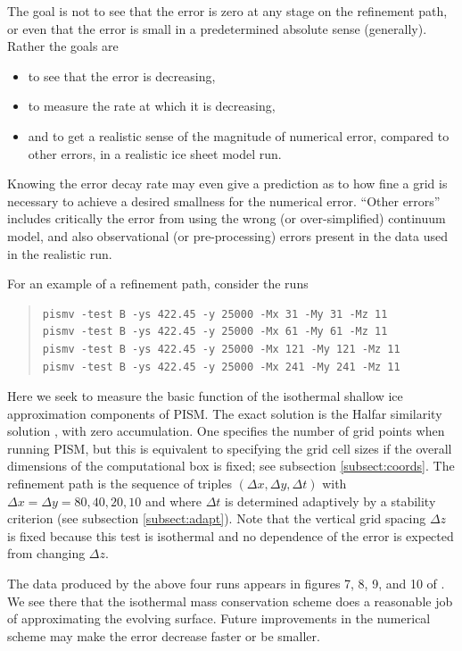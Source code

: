 \documentclass[11pt,final]{amsart}
\begin{document}
The goal is not to see that the error is zero at any stage on the refinement path, or even that the error is small in a predetermined absolute sense (generally).  Rather the goals are \begin{itemize}
\item to see that the error is decreasing,
\item to measure the rate at which it is decreasing,
\item and to get a realistic sense of the magnitude of numerical error, compared to other errors, in a realistic ice sheet model run.
\end{itemize}
Knowing the error decay rate may even give a prediction as to how fine a grid is necessary to achieve a desired smallness for the numerical error.  ``Other errors'' includes critically the error from using the wrong (or over-simplified) continuum model, and also observational (or pre-processing) errors present in the data used in the realistic run.

For an example of a refinement path, consider the runs
\begin{quote}\small\begin{verbatim}
pismv -test B -ys 422.45 -y 25000 -Mx 31 -My 31 -Mz 11
pismv -test B -ys 422.45 -y 25000 -Mx 61 -My 61 -Mz 11
pismv -test B -ys 422.45 -y 25000 -Mx 121 -My 121 -Mz 11
pismv -test B -ys 422.45 -y 25000 -Mx 241 -My 241 -Mz 11
\end{verbatim}
\normalsize\end{quote}
Here we seek to measure the basic function of the isothermal shallow ice approximation components of PISM.  The exact solution is the Halfar similarity solution \cite{Halfar83}, with zero accumulation.  One specifies the number of grid points when running PISM, but this is equivalent to specifying the grid cell sizes if the overall dimensions of the computational box is fixed; see subsection \ref{subsect:coords}.  The refinement path is the sequence of triples $(\Delta x,\Delta y,\Delta t)$ with $\Delta x = \Delta y = 80,40,20,10$ and where $\Delta t$ is determined adaptively by a stability criterion (see subsection \ref{subsect:adapt}).  Note that the vertical grid spacing $\Delta z$ is fixed because this test is isothermal and no dependence of the error is expected from changing $\Delta z$.

The data produced by the above four runs appears in figures 7, 8, 9, and 10 of \cite{BLKCB}.  We see there that the isothermal mass conservation scheme does a reasonable job of approximating the evolving surface.  Future improvements in the numerical scheme may make the error decrease faster or be smaller.
\end{document}
